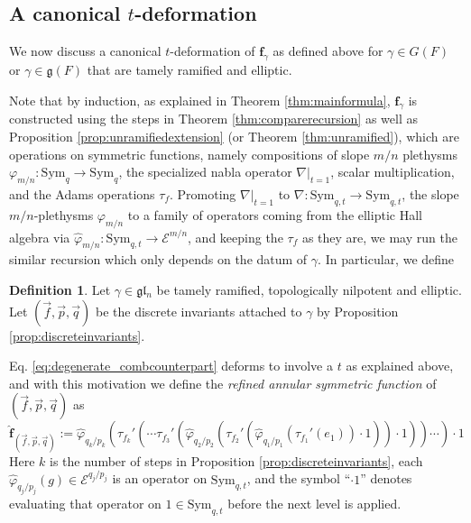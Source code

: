 \documentclass{amsart}
\numberwithin{equation}{section}
\theoremstyle{definition}
\newtheorem{definition}[lemma]{Definition}%
\def\Sym{{\mathrm{Sym}}}
\newcommand{\fgamma}{\mathbf{f}_{\gamma}}
\newcommand{\cE}{\mathcal{E}}
\newcommand{\fl}{\mathfrak{l}}
\newcommand{\fg}{\mathfrak{g}}
\begin{document}
\subsection{A canonical $t$-deformation}
\label{sec:tdeformation}
We now discuss a canonical $t$-deformation of $\fgamma$ as defined above for 
$\gamma\in G(F)$ or $\gamma\in \fg(F)$ that are tamely ramified and elliptic.

Note that by induction, as explained in Theorem \ref{thm:mainformula}, $\fgamma$ is constructed using the steps in Theorem \ref{thm:comparerecursion} as well as Proposition \ref{prop:unramifiedextension} (or Theorem \ref{thm:unramified}), which are operations on symmetric functions, namely compositions of slope $m/n$ plethysms $\varphi_{m/n}: \Sym_q\to \Sym_q$, the specialized nabla operator $\nabla|_{t=1}$, scalar multiplication, and the Adams operations $\tau_f$. 
Promoting $\nabla|_{t=1}$ to $\nabla: \Sym_{q,t}\to \Sym_{q,t}$, the slope $m/n$-plethysms $\varphi_{m/n}$ to a family of operators coming from the elliptic Hall algebra via $\widehat{\varphi}_{m/n}:\Sym_{q,t}\to \cE^{m/n}$, and keeping the $\tau_f$ as they are, we may run the similar recursion which only depends on the datum of $\gamma$.
In particular, we define 
\begin{definition}
\label{def:fullfgamma}
Let $\gamma\in \fg\fl_n$ be tamely ramified, topologically nilpotent and elliptic. Let $(\vec{f},\vec{p},\vec{q})$ be the discrete invariants attached to $\gamma$ by Proposition \ref{prop:discreteinvariants}. 

Eq. \eqref{eq:degenerate_combcounterpart} deforms to involve a $t$ as explained above, and with this motivation we define the {\em refined annular symmetric function} of $(\vec{f},\vec{p},\vec{q})$  as $$
\widehat{\mathbf{f}}_{(\vec{f},\vec{p},\vec{q})}:=
\widehat{\varphi}_{q_k/p_k}(\tau_{f_k}'(\cdots\tau_{f_3}'(\widehat{\varphi}_{q_{2}/p_{2}}(\tau_{f_2}'(\widehat{\varphi}_{q_1/p_1}(\tau_{f_1}'(e_1))\cdot 1))\cdot 1))\cdots)\cdot 1$$
Here $k$ is the number of steps in Proposition \ref{prop:discreteinvariants}, each $\widehat{\varphi}_{q_j/p_j}(g)\in\cE^{q_j/p_j}$ is an operator on $\Sym_{q,t}$, and the symbol ``$\cdot 1$'' denotes evaluating that operator on $1\in\Sym_{q,t}$ before the next level is applied.
\end{definition}
\end{document}
